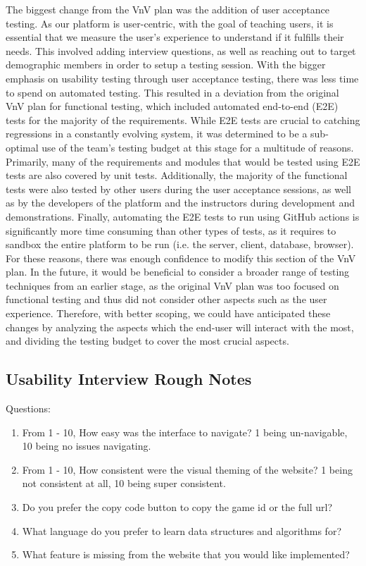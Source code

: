 \documentclass[12pt, titlepage]{article}
\begin{document}
  The biggest change from the VnV plan was the addition of user acceptance testing. As our platform is user-centric, with the goal of teaching users, it is essential that we measure the user's experience to understand if it fulfills their needs. This involved adding interview questions, as well as reaching out to target demographic members in order to setup a testing session. With the bigger emphasis on usability testing through user acceptance testing, there was less time to spend on automated testing. This resulted in a deviation from the original VnV plan for functional testing, which included automated end-to-end (E2E) tests for the majority of the requirements. While E2E tests are crucial to catching regressions in a constantly evolving system, it was determined to be a sub-optimal use of the team's testing budget at this stage for a multitude of reasons. Primarily, many of the requirements and modules that would be tested using E2E tests are also covered by unit tests. Additionally, the majority of the functional tests were also tested by other users during the user acceptance sessions, as well as by the developers of the platform and the instructors during development and demonstrations. Finally, automating the E2E tests to run using GitHub actions is significantly more time consuming than other types of tests, as it requires to sandbox the entire platform to be run (i.e. the server, client, database, browser). For these reasons, there was enough confidence to modify this section of the VnV plan. In the future, it would be beneficial to consider a broader range of testing techniques from an earlier stage, as the original VnV plan was too focused on functional testing and thus did not consider other aspects such as the user experience. Therefore, with better scoping, we could have anticipated these changes by analyzing the aspects which the end-user will interact with the most, and dividing the testing budget to cover the most crucial aspects.
  
\subsection{Usability Interview Rough Notes}\label{roughnotes}
Questions:
\begin{enumerate}
    \item From 1 - 10, How easy was the interface to navigate? 1 being un-navigable, 10 being no issues navigating.
    \item From 1 - 10, How consistent were the visual theming of the website? 1 being not consistent at all, 10 being super consistent. 
    \item Do you prefer the copy code button to copy the game id or the full url?
    \item What language do you prefer to learn data structures and algorithms for?
    \item What feature is missing from the website that you would like implemented?
\end{enumerate}
\end{document}
